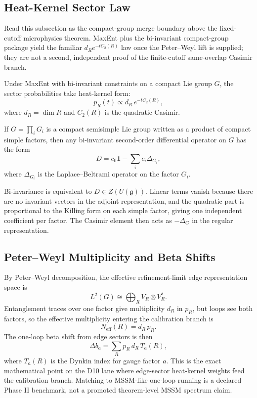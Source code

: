 \subsection{Heat-Kernel Sector Law}

Read this subsection as the compact-group merge boundary above the fixed-cutoff microphysics
theorem. MaxEnt plus the bi-invariant compact-group package yield the familiar
\(d_R e^{-tC_2(R)}\) law once the Peter--Weyl lift is supplied; they are not a second,
independent proof of the finite-cutoff same-overlap Casimir branch.

\begin{theorem}
Under MaxEnt with bi-invariant constraints on a compact Lie group \(G\), the sector probabilities
take heat-kernel form:
\[
p_R(t)\propto d_R\,e^{-tC_2(R)},
\]
where \(d_R=\dim R\) and \(C_2(R)\) is the quadratic Casimir.
\end{theorem}

\begin{lemma}
If \(G=\prod_i G_i\) is a compact semisimple Lie group written as a product of compact simple
factors, then any bi-invariant second-order differential operator on \(G\) has the form
\[
D=c_0\mathbf 1-\sum_i c_i\Delta_{G_i},
\]
where \(\Delta_{G_i}\) is the Laplace--Beltrami operator on the factor \(G_i\).
\end{lemma}

\begin{remark}
Bi-invariance is equivalent to \(D\in Z(U(\mathfrak g))\). Linear terms vanish because there are
no invariant vectors in the adjoint representation, and the quadratic part is proportional to the
Killing form on each simple factor, giving one independent coefficient per factor. The Casimir
element then acts as \(-\Delta_G\) in the regular representation.
\end{remark}

\subsection{Peter--Weyl Multiplicity and Beta Shifts}

By Peter--Weyl decomposition, the effective refinement-limit edge representation space is
\[
L^2(G)\cong \bigoplus_R V_R\otimes V_R^*.
\]
Entanglement traces over one factor give multiplicity \(d_R\) in \(p_R\), but loops see both
factors, so the effective multiplicity entering the calibration branch is
\[
N_{\mathrm{eff}}(R)=d_R\,p_R.
\]
The one-loop beta shift from edge sectors is then
\[
\Delta b_a=\sum_R p_R\,d_R\,T_a(R),
\]
where \(T_a(R)\) is the Dynkin index for gauge factor \(a\). This is the exact mathematical point
on the D10 lane where edge-sector heat-kernel weights feed the calibration branch. Matching to
MSSM-like one-loop running is a declared Phase II benchmark, not a promoted theorem-level
MSSM spectrum claim.

